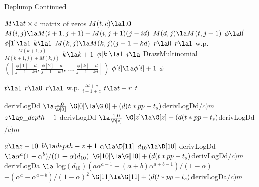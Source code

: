 \begin{algorithm}
	\begin{algorithmic}[1]
	\caption{Deplump Continued}
	
		\State $M \la  t \times c$ matrix of zeros
		\State $M(t,c) \la 1.0$
				\State $M(i,j) \la M(i +1, j+1) + M(i,j+1)(j - id)$ 
			\EndFor
			\State $M(d,j) \la M(t,j+1)$
		\EndFor
		\State $\phi \la \vec 0$ 
		\State $\phi[1] \la 1$
		\State $k \la 1$
			\State $M(k,j) \la M(k,j)(j-1 -k d)$
			\State $r \la 0$
			\State $r \la 1 $ w.p. $\frac{M(k+1,j)}{M(k+1,j) + M(k,j)}$
				\State $k \la k + 1$
				\State $\phi[k]  \la 1$
			\Else
				\State $i \la$ DrawMultinomial$([\frac{\phi[1] - d}{j-1 -kd}, \frac{\phi[2] - d}{j-1 -kd}, \ldots, \frac{\phi[k] - d}{j-1 -kd}])$
				\State $\phi[i] \la \phi[i] + 1$
			\EndIf
		\EndFor
		\State \Return $\phi$
	\EndFunction


		\State $t \la 1$
			\State $r \la 0$
			\State $r  \la 1$ w.p. $\frac{td + c}{i-1 + c}$
			\State $t \la t + r$
		\EndFor
		\State \Return $t$
	\EndFunction
	
				\State derivLogDd $\la \frac{1.0}{\D[0]}$
				\State $\G[0] \la \G[0] + (d(t * pp - t_s)$derivLogDd$ / c)  m$
			\Else
				\State $z \la p\_depth + 1$
					\State derivLogDd $\la \frac{1.0}{\D[z]}$
					\State $\G[z] \la \G[z] + (d(t * pp - t_s)$derivLogDd$ / c)  m$	
				\EndWhile
				
					\State $a \la z - 10$
					\State $b \la depth - z + 1$
					\State $\alpha \la \D[11]$
					\State $d_{10} \la \D[10]$
					\State derivLogDd $\la \alpha^a(1 - \alpha^b) / ((1 - \alpha)  d_{10})$ 
					\State $\G[10] \la \G[10] + (d(t * pp - t_s)$derivLogDd$ / c)  m$	
					\State derivLogDa $\la$ log$(d_{10}) (a \alpha^{a-1} - (a + b)\alpha^{a + b-1}) / (1 - \alpha) $
					\State \hspace{4cm} $+ (\alpha^a - \alpha^{a + b}) / (1 - \alpha)^2$
					\State $\G[11] \la \G[11] + (d(t * pp - t_s)$derivLogDa$ / c)  m$	
				\EndIf
				
			\EndIf
			
		\EndIf
	\EndFunction

	
		\end{algorithmic}	
\end{algorithm}

